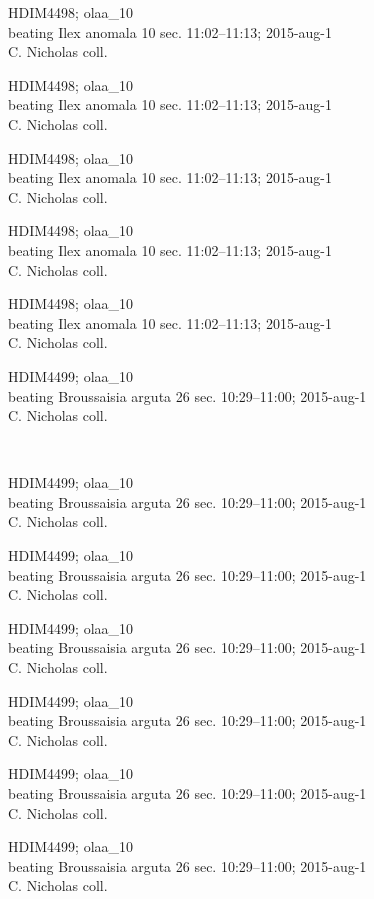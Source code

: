 \documentclass[2pt]{extarticle}
\begin{document}
\noindent
\parbox{0.16\textwidth}{\tiny \raggedright \rule[-0.3\baselineskip]{0pt}{10pt}HDIM4498; olaa\_10\\ beating Ilex anomala 10 sec. 11:02--11:13; 2015-aug-1\\ C. Nicholas coll.}
\parbox{0.16\textwidth}{\tiny \raggedright \rule[-0.3\baselineskip]{0pt}{10pt}HDIM4498; olaa\_10\\ beating Ilex anomala 10 sec. 11:02--11:13; 2015-aug-1\\ C. Nicholas coll.}
\parbox{0.16\textwidth}{\tiny \raggedright \rule[-0.3\baselineskip]{0pt}{10pt}HDIM4498; olaa\_10\\ beating Ilex anomala 10 sec. 11:02--11:13; 2015-aug-1\\ C. Nicholas coll.}
\parbox{0.16\textwidth}{\tiny \raggedright \rule[-0.3\baselineskip]{0pt}{10pt}HDIM4498; olaa\_10\\ beating Ilex anomala 10 sec. 11:02--11:13; 2015-aug-1\\ C. Nicholas coll.}
\parbox{0.16\textwidth}{\tiny \raggedright \rule[-0.3\baselineskip]{0pt}{10pt}HDIM4498; olaa\_10\\ beating Ilex anomala 10 sec. 11:02--11:13; 2015-aug-1\\ C. Nicholas coll.}
\parbox{0.16\textwidth}{\tiny \raggedright \rule[-0.3\baselineskip]{0pt}{10pt}HDIM4499; olaa\_10\\ beating Broussaisia arguta 26 sec. 10:29--11:00; 2015-aug-1\\ C. Nicholas coll.} \\ 
\vspace{0.001in} 

\noindent
\parbox{0.16\textwidth}{\tiny \raggedright \rule[-0.3\baselineskip]{0pt}{10pt}HDIM4499; olaa\_10\\ beating Broussaisia arguta 26 sec. 10:29--11:00; 2015-aug-1\\ C. Nicholas coll.}
\parbox{0.16\textwidth}{\tiny \raggedright \rule[-0.3\baselineskip]{0pt}{10pt}HDIM4499; olaa\_10\\ beating Broussaisia arguta 26 sec. 10:29--11:00; 2015-aug-1\\ C. Nicholas coll.}
\parbox{0.16\textwidth}{\tiny \raggedright \rule[-0.3\baselineskip]{0pt}{10pt}HDIM4499; olaa\_10\\ beating Broussaisia arguta 26 sec. 10:29--11:00; 2015-aug-1\\ C. Nicholas coll.}
\parbox{0.16\textwidth}{\tiny \raggedright \rule[-0.3\baselineskip]{0pt}{10pt}HDIM4499; olaa\_10\\ beating Broussaisia arguta 26 sec. 10:29--11:00; 2015-aug-1\\ C. Nicholas coll.}
\parbox{0.16\textwidth}{\tiny \raggedright \rule[-0.3\baselineskip]{0pt}{10pt}HDIM4499; olaa\_10\\ beating Broussaisia arguta 26 sec. 10:29--11:00; 2015-aug-1\\ C. Nicholas coll.}
\parbox{0.16\textwidth}{\tiny \raggedright \rule[-0.3\baselineskip]{0pt}{10pt}HDIM4499; olaa\_10\\ beating Broussaisia arguta 26 sec. 10:29--11:00; 2015-aug-1\\ C. Nicholas coll.} \\ 
\vspace{0.001in} 
\end{document}
